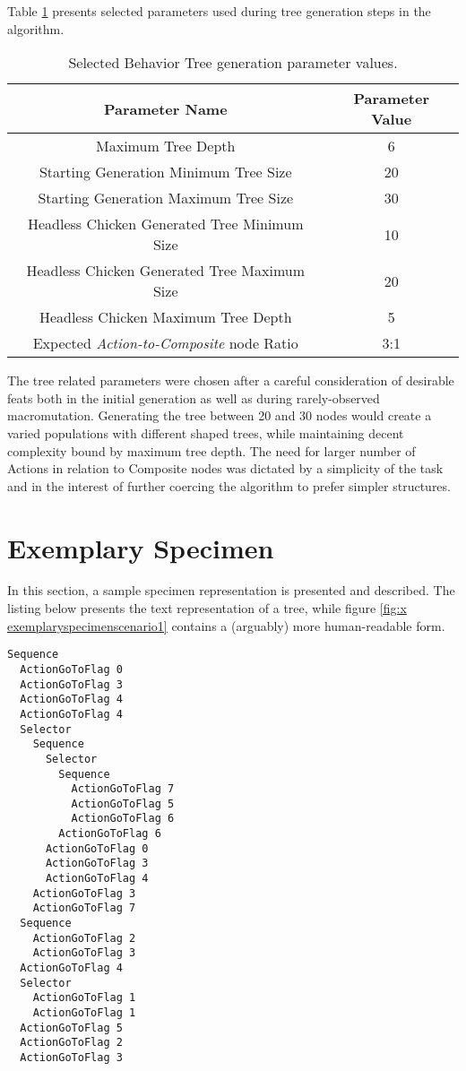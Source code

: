 Table \ref{table:x selectedbtparameters} presents selected parameters used during tree generation steps in the algorithm.
\begin{table} [h]
    \centering
    \begin{tabular} {c c}
        \hline \hline
        Parameter Name & Parameter Value \\
        \hline
        Maximum Tree Depth & 6 \\
        Starting Generation Minimum Tree Size & 20 \\
        Starting Generation Maximum Tree Size & 30 \\
        Headless Chicken Generated Tree Minimum Size & 10 \\
        Headless Chicken Generated Tree Maximum Size & 20 \\
        Headless Chicken Maximum Tree Depth & 5 \\
        Expected \textit{Action-to-Composite} node Ratio & 3:1 \\
    \end{tabular}
    \caption{Selected Behavior Tree generation parameter values.}
    \label{table:x selectedbtparameters}
\end{table}
The tree related parameters were chosen after a careful consideration of desirable feats both in the initial generation as well as during rarely-observed macromutation. Generating the tree between 20 and 30 nodes would create a varied populations with different shaped trees, while maintaining decent complexity bound by maximum tree depth. The need for larger number of Actions in relation to Composite nodes was dictated by a simplicity of the task and in the interest of further coercing the algorithm to prefer simpler structures.
\newpage
\section{Exemplary Specimen}
In this section, a sample specimen representation is presented and described. The listing below presents the text representation of a tree, while figure \ref{fig:x exemplaryspecimenscenario1} contains a (arguably) more human-readable form.
\begin{lstlisting}
Sequence
  ActionGoToFlag 0
  ActionGoToFlag 3
  ActionGoToFlag 4
  ActionGoToFlag 4
  Selector
    Sequence
      Selector
        Sequence
          ActionGoToFlag 7
          ActionGoToFlag 5
          ActionGoToFlag 6
        ActionGoToFlag 6
      ActionGoToFlag 0
      ActionGoToFlag 3
      ActionGoToFlag 4
    ActionGoToFlag 3
    ActionGoToFlag 7
  Sequence
    ActionGoToFlag 2
    ActionGoToFlag 3
  ActionGoToFlag 4
  Selector
    ActionGoToFlag 1
    ActionGoToFlag 1
  ActionGoToFlag 5
  ActionGoToFlag 2
  ActionGoToFlag 3
\end{lstlisting}

